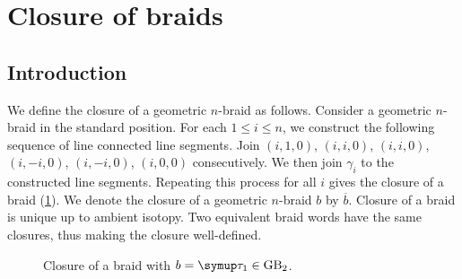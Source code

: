 \section{Closure of braids}

\subsection{Introduction}

We define the closure of a geometric \(n\)-braid as follows. Consider a geometric \(n\)-braid in the standard position. For each \(1 \leq i \leq n\), we construct the following sequence of line connected line segments. Join \((i, 1, 0)\), \((i, i, 0)\), \((i, i, 0)\), \((i, -i, 0)\), \((i, -i, 0)\), \((i, 0, 0)\) consecutively. We then join \(\gamma_i\) to the constructed line segments. Repeating this process for all \(i\) gives the closure of a braid (\cref{fig:closure}). We denote the closure of a geometric \(n\)-braid \(b\) by \(\overline{b}\). Closure of a braid is unique up to ambient isotopy. Two equivalent braid words have the same closures, thus making the closure well-defined.

\begin{figure}[H]\centering
	\quad\quad{}
	\caption{Closure of a braid with \(b = \tauu_1 \in \GB_2\).}
	\label{fig:closure}
\end{figure}

